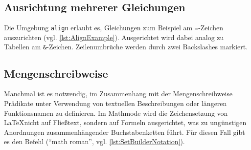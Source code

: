 
\subsection{Ausrichtung mehrerer Gleichungen}

Die Umgebung \texttt{align} erlaubt es, Gleichungen zum Beispiel am \texttt{=}-Zeichen auszurichten (vgl. \cref{lst:AlignExample}).
Ausgerichtet wird dabei analog zu Tabellen am \texttt{\&}-Zeichen.
Zeilenumbrüche werden durch zwei Backslashes markiert.


\subsection{Mengenschreibweise}

Manchmal ist es notwendig, im Zusammenhang mit der Mengenschreibweise Prädikate unter Verwendung von textuellen Beschreibungen oder längeren Funktionsnamen zu definieren.
Im Mathmode wird die Zeichensetzung von \LaTeX nicht auf Fließtext, sondern auf Formeln ausgerichtet, was zu ungünstigen Anordnungen zusammenhängender Buchstabenketten führt.
Für diesen Fall gibt es den Befehl \texttt{\mathrm{}} (\enquote{math roman}, vgl. \cref{lst:SetBuilderNotation}).

